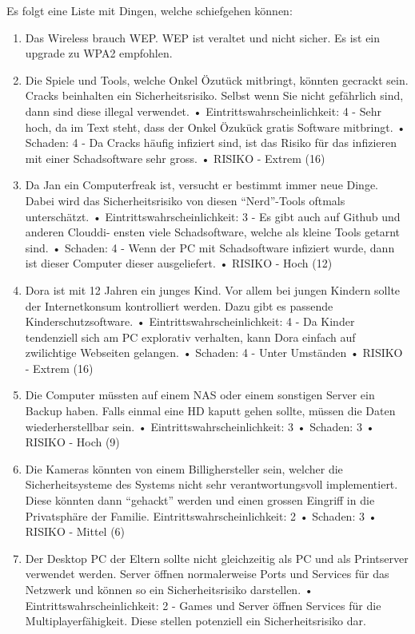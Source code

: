 \documentclass{article}
\begin{document}
Es folgt eine Liste mit Dingen, welche schiefgehen können:
\begin{enumerate}
\item Das Wireless brauch WEP. WEP ist veraltet und nicht sicher. Es ist ein upgrade
zu WPA2 empfohlen.
\item Die Spiele und Tools, welche Onkel Özutück mitbringt, könnten gecrackt sein.
Cracks beinhalten ein Sicherheitsrisiko. Selbst wenn Sie nicht gefährlich sind, dann
sind diese illegal verwendet.
• Eintrittswahrscheinlichkeit: 4 - Sehr hoch, da im Text steht, dass der Onkel
Özukück gratis Software mitbringt.
• Schaden: 4 - Da Cracks häufig infiziert sind, ist das Risiko für das infizieren
mit einer Schadsoftware sehr gross.
• RISIKO - Extrem (16)
\item Da Jan ein Computerfreak ist, versucht er bestimmt immer neue Dinge. Dabei
wird das Sicherheitsrisiko von diesen “Nerd”-Tools oftmals unterschätzt.
• Eintrittswahrscheinlichkeit: 3 - Es gibt auch auf Github und anderen Clouddi-
ensten viele Schadsoftware, welche als kleine Tools getarnt sind.
• Schaden: 4 - Wenn der PC mit Schadsoftware infiziert wurde, dann ist dieser
Computer dieser ausgeliefert.
• RISIKO - Hoch (12)
\item Dora ist mit 12 Jahren ein junges Kind. Vor allem bei jungen Kindern sollte der
Internetkonsum kontrolliert werden. Dazu gibt es passende Kinderschutzsoftware.
• Eintrittswahrscheinlichkeit: 4 - Da Kinder tendenziell sich am PC explorativ
verhalten, kann Dora einfach auf zwilichtige Webseiten gelangen.
• Schaden: 4 - Unter Umständen
• RISIKO - Extrem (16)
\item Die Computer müssten auf einem NAS oder einem sonstigen Server ein Backup
haben. Falls einmal eine HD kaputt gehen sollte, müssen die Daten wiederherstellbar
sein.
• Eintrittswahrscheinlichkeit: 3
• Schaden: 3
• RISIKO - Hoch (9)
\item Die Kameras könnten von einem Billighersteller sein, welcher die Sicherheitsysteme
des Systems nicht sehr verantwortungsvoll implementiert. Diese könnten dann
“gehackt” werden und einen grossen Eingriff in die Privatsphäre der Familie.
Eintrittswahrscheinlichkeit: 2
• Schaden: 3
• RISIKO - Mittel (6)
\item Der Desktop PC der Eltern sollte nicht gleichzeitig als PC und als Printserver
verwendet werden. Server öffnen normalerweise Ports und Services für das Netzwerk
und können so ein Sicherheitsrisiko darstellen.
• Eintrittswahrscheinlichkeit: 2 - Games und Server öffnen Services für die
Multiplayerfähigkeit. Diese stellen potenziell ein Sicherheitsrisiko dar.

\end{enumerate}
\end{document}
